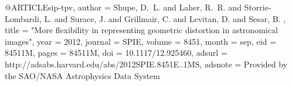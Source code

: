 @ARTICLE{sip-tpv,
   author = {{Shupe}, D.~L. and {Laher}, R.~R. and {Storrie-Lombardi}, L. and
	{Surace}, J. and {Grillmair}, C. and {Levitan}, D. and {Sesar}, B.
	},
    title = "{More flexibility in representing geometric distortion in astronomical images}",
     year = 2012,
   journal = {SPIE},
   volume = 8451,
    month = sep,
      eid = {84511M},
    pages = {84511M},
      doi = {10.1117/12.925460},
   adsurl = {http://adsabs.harvard.edu/abs/2012SPIE.8451E..1MS},
  adsnote = {Provided by the SAO/NASA Astrophysics Data System}
}

